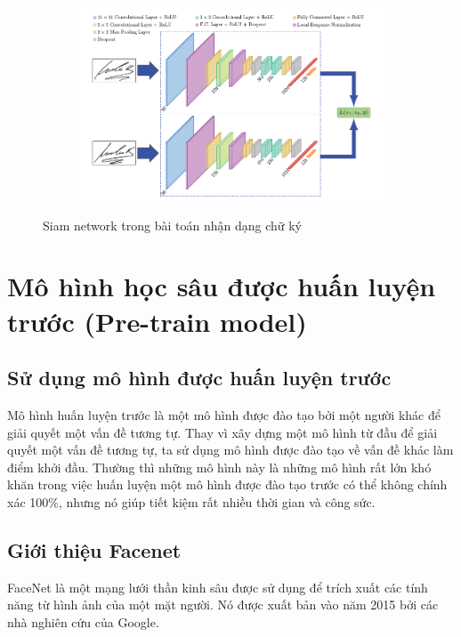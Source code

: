 \begin{figure}
    \begin{subfigure}{1.\textwidth}
        \begin{center}
            \includegraphics[width=1.\linewidth]{Chapters/items/siam.png}
        \end{center}
        \label{fig: siam}
    \end{subfigure}
    \caption{Siam network trong bài toán nhận dạng chữ ký}
\end{figure}


\newpage
\section{Mô hình học sâu được huấn luyện trước (Pre-train model)}
\subsection{Sử dụng mô hình được huấn luyện trước}

Mô hình huấn luyện trước là một mô hình được đào tạo bởi một người khác để giải quyết
một vấn đề tương tự. Thay vì xây dựng một mô hình từ đầu để giải quyết một vấn đề tương tự,
ta sử dụng mô hình được đào tạo về vấn đề khác làm điểm khởi đầu.
Thường thì những mô hình này là những mô hình rất lớn khó khăn trong việc huấn luyện
một mô hình được đào tạo trước có thể không chính xác 100\%,
nhưng nó giúp tiết kiệm rất nhiều thời gian và công sức.

\subsection{Giới thiệu Facenet}

FaceNet\cite{FaceNet} là một mạng lưới thần kinh sâu được sử dụng để trích xuất các tính năng từ
hình ảnh của một mặt người. Nó được xuất bản vào năm 2015 bởi các nhà nghiên cứu của Google.

